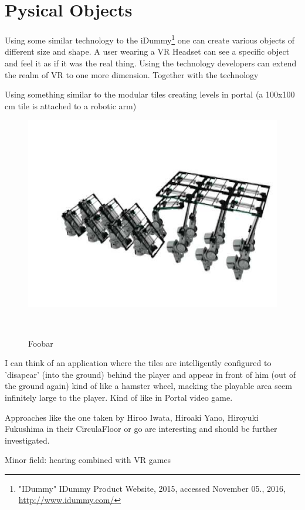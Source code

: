 \section{Pysical Objects}

Using some similar technology to the iDummy\footnote{"IDummy" IDummy Product Website, 2015, accessed November 05., 2016, \url{http://www.idummy.com/}} one can create various objects of different size and shape. A user wearing a VR Headset can see a specific object and feel it as if it was the real thing. Using the technology developers can extend the realm of VR to one more dimension. Together with the technology \cite{Azmandian:2016:HRD:2858036.2858226}

Using something similar to the modular tiles creating levels in portal (a 100x100 cm tile is attached to a robotic arm)

\begin{figure}
	\centering
	\includegraphics[width=0.9\columnwidth]{./figures/hqdefault}
	\caption{Foobar}~\label{fig:figure2}
\end{figure}

I can think of an application where the tiles are intelligently configured to 'disapear' (into the ground) behind the player and appear in front of him (out of the ground again) kind of like a hamster wheel, macking the playable area seem infinitely large to the player. Kind of like in Portal \cite{game:portal} video game.

Approaches like the one taken by Hiroo Iwata, Hiroaki Yano, Hiroyuki Fukushima in their CirculaFloor \cite{Iwata:2005:CLI:1078037.1079777} or \cite{Souman:2010:MVW:1670671.1670675} go are interesting and should be further investigated. 

Minor field: hearing combined with VR games

